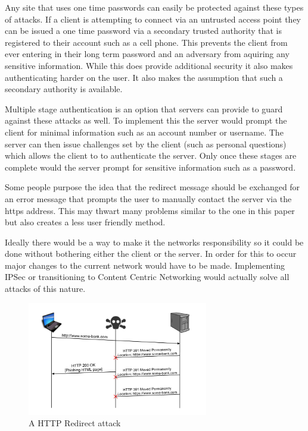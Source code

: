 \documentclass{article}
\begin{document}
Any site that uses one time passwords can easily be protected against these types of attacks.  If a client is attempting to connect via an untrusted access point they can be issued a one time password via a secondary trusted authority that is registered to their account such as a cell phone.  This prevents the client from ever entering in their long term password and an adversary from aquiring any sensitive information.  While this does provide additional security it also makes authenticating harder on the user.  It also makes the assumption that such a secondary authority is available.

Multiple stage authentication is an option that servers can provide to guard against these attacks as well.  To implement this the server would prompt the client for minimal information such as an account number or username.  The server can then issue challenges set by the client (such as personal questions) which allows the client to to authenticate the server.  Only once these stages are complete would the server prompt for sensitive information such as a password.

Some people purpose the idea that the redirect message should be exchanged for an error message that prompts the user to manually contact the server via the https address.  This may thwart many problems similar to the one in this paper but also creates a less user friendly method.

Ideally there would be a way to make it the networks responsibility so it could be done without bothering either the client or the server.  In order for this to occur major changes to the current network would have to be made.  Implementing IPSec or transitioning to Content Centric Networking would actually solve all attacks of this nature.

\begin{figure}[t]
\begin{center}

\includegraphics[width=3.1in]{redirect_attack.png} 
\caption{A HTTP Redirect attack} 
\label{fg:attack}

\end{center}
\end{figure}
\end{document}
